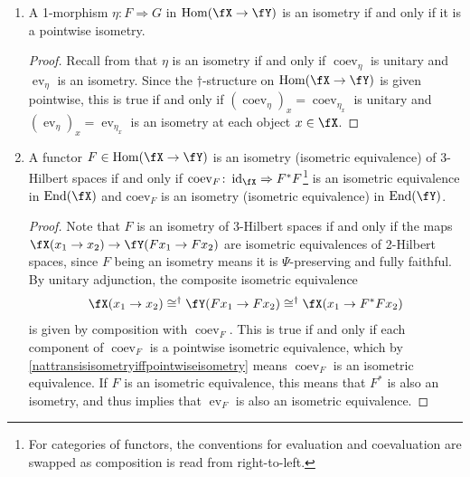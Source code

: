 \documentclass[12pt, reqno]{amsart}
\newcommand{\Bim}{\mathsf{Bim}}
\DeclareMathOperator{\coev}{coev}
\DeclareMathOperator{\End}{End}
\DeclareMathOperator{\ev}{ev}
\DeclareMathOperator{\Hom}{Hom}
\DeclareMathOperator{\id}{id}
\newcommand{\Mod}{\mathsf{Mod}}
\theoremstyle{plain}
\theoremstyle{definition}
\begin{document}
\begin{enumerate}[label=(D\arabic*)]
\begin{proof}
On the other hand, if we calculate the dimension of $F\cC$ as a $\cC$--$\cD$-bimodule in $\Bim^\dag(\cC,\cD) \cong \Mod^\dag(\cC^{\mathrm{mp}}\boxtimes\cD)$, we get
\[ \frac{\delta_{\cC^{\mathrm{mp}}\boxtimes\cD}}{D_{\cC^{\mathrm{mp}}\boxtimes\cD}}\sum_{m \in \pi_0F\cC}\left(d^{F\cC}_m\right)^2, \]
which is visibly equal to the above.
\end{proof}

\item \label{nattransisisometryiffpointwiseisometry}
A 1-morphism $\eta\colon  F\Rightarrow G$ in $\Hom(\fX\to \fY)$ is an isometry if and only if it is a pointwise isometry.
\begin{proof}
Recall from \cite[Rem.~4.12]{MR5078555} that $\eta$ is an isometry if and only if $\coev_\eta$ is unitary and $\ev_\eta$ is an isometry.
Since the $\dagger$-structure on $\Hom(\fX\to \fY)$ is given pointwise, this is true if and only if $(\coev_\eta)_x=\coev_{\eta_x}$ is unitary and $(\ev_\eta)_x=\ev_{\eta_x}$ is an isometry at each object $x \in \fX$.
\end{proof}

\item \label{isometriesin4Hilb} 
A functor $F\in\Hom(\fX\to\fY)$ is an isometry (isometric equivalence) of 3-Hilbert spaces if and only if
$\mathrm{coev}_F\colon \id_{\fX}\Rightarrow F^*F$\footnote{For categories of functors, the conventions for evaluation and coevaluation are swapped as composition is read from right-to-left.} is an isometric equivalence in $\End(\fX)$ and $\mathrm{coev}_F$ is an isometry (isometric equivalence) in $\End(\fY)$. 
\begin{proof}
Note that $F$ is an isometry of 3-Hilbert spaces if and only if the maps $\fX(x_1 \to x_2) \to \fY(Fx_1 \to Fx_2)$ are isometric equivalences of 2-Hilbert spaces, since $F$ being an isometry means it is $\Psi$-preserving and fully faithful.
By unitary adjunction, the composite isometric equivalence $$
\fX(x_1 \to x_2) \cong^\dag \fY(Fx_1 \to Fx_2) \cong^\dag \fX(x_1 \to F^*Fx_2)
$$ 
is given by composition with $\coev_F$.
This is true if and only if each component of $\coev_F$ is a pointwise isometric equivalence, which by \ref{nattransisisometryiffpointwiseisometry} means $\coev_F$ is an isometric equivalence.
If $F$ is an isometric equivalence, this means that $F^*$ is also an isometry, and thus implies that $\ev_F$ is also an isometric equivalence.
\end{proof}


\end{enumerate}
\end{document}
